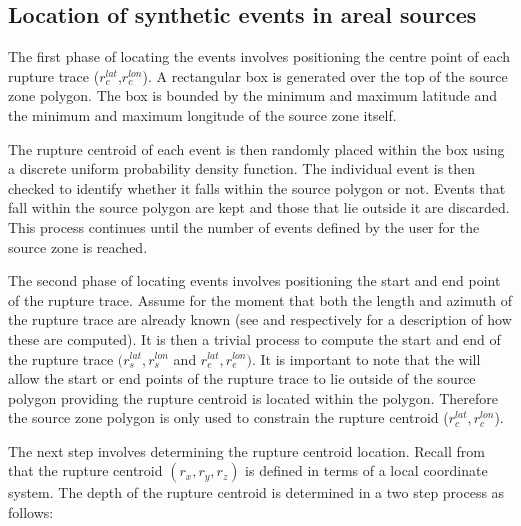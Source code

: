 \subsection{Location of synthetic events in areal sources}
\label{sec:areal_locn}

The first phase of locating the events involves positioning the
centre point of each rupture trace ($r_c^{lat}$,$r_c^{lon}$). A
rectangular box is generated over the top of the source zone polygon. The
box is bounded by the minimum and maximum latitude and the
minimum and maximum longitude of the source zone itself. 


The rupture centroid of each event is then randomly placed within the box 
using a discrete uniform probability density function. The individual event is then checked to identify whether 
it falls within the source polygon or not. Events that fall within the source polygon 
are kept and those that lie outside it are discarded. This process continues until the number of events 
defined by the user for the source zone is reached.

The second phase of locating events involves positioning the start and end
point of the rupture trace. Assume for the moment that both the
length and azimuth of the rupture trace are already known (see
 and  respectively
for a description of how these are computed). It is then a trivial
process to compute the start and end of the rupture trace
$(r_s^{lat},r_s^{lon}$ and $r_e^{lat},r_e^{lon})$. It is important to note that the  will allow the 
start or end points of the rupture trace to lie outside of the source polygon 
providing the rupture centroid is located within the polygon. Therefore the source zone polygon 
is only used to constrain the rupture centroid ($r_c^{lat},r_c^{lon}$).

The next step involves determining the rupture centroid location.
Recall from  that the rupture centroid
$(r_x,r_y,r_z)$ is defined in terms of a local coordinate system.
The depth of the rupture centroid is determined in a two step
process as follows:

